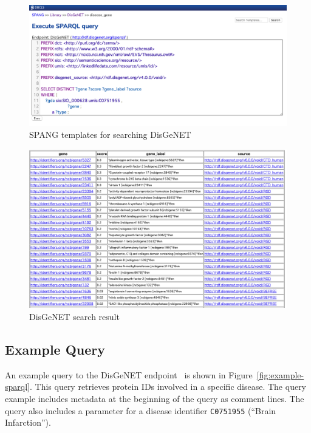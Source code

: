 \documentclass[runningheads]{llncs}
\begin{document}
\begin{figure}
\center
\includegraphics[width=1.0\textwidth]{spang_disease_gene_query.png}
\caption{SPANG templates for searching DisGeNET}
\label{fig:spang_disease_gene_query}
\end{figure}

\begin{figure}
\center
\includegraphics[width=1.0\textwidth]{spang_disease_gene_result.png}
\caption{DisGeNET search result}
\label{fig:spang_disease_gene_result}
\end{figure}


\subsection{Example Query}
\label{subsec:example-sparql}

An example query to the DisGeNET endpoint~\cite{disgenet} is shown in Figure~\ref{fig:example-sparql}.
This query retrieves protein IDs involved in a specific disease.
The query example includes metadata at the beginning of the query as comment lines.
The query also includes a parameter for a disease identifier \texttt{C0751955} (``Brain Infarction'').
\end{document}
